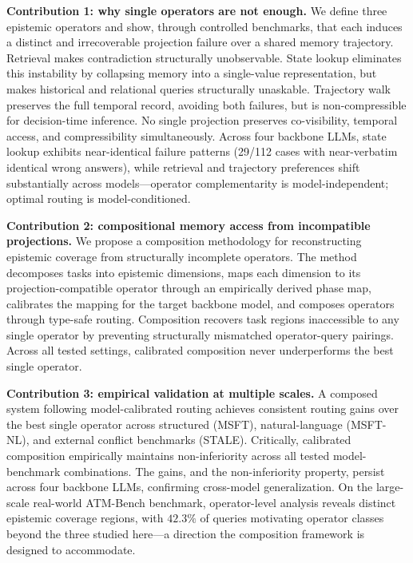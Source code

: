 \documentclass[letterpaper,twocolumn,10pt]{article}
\begin{document}
\textbf{Contribution 1: why single operators are not enough.} We define three epistemic operators and show, through controlled benchmarks, that each induces a distinct and irrecoverable projection failure over a shared memory trajectory. Retrieval makes contradiction structurally unobservable. State lookup eliminates this instability by collapsing memory into a single-value representation, but makes historical and relational queries structurally unaskable. Trajectory walk preserves the full temporal record, avoiding both failures, but is non-compressible for decision-time inference. No single projection preserves co-visibility, temporal access, and compressibility simultaneously. Across four backbone LLMs, state lookup exhibits near-identical failure patterns (29/112 cases with near-verbatim identical wrong answers), while retrieval and trajectory preferences shift substantially across models---operator complementarity is model-independent; optimal routing is model-conditioned.

\textbf{Contribution 2: compositional memory access from incompatible projections.} We propose a composition methodology for reconstructing epistemic coverage from structurally incomplete operators. The method decomposes tasks into epistemic dimensions, maps each dimension to its projection-compatible operator through an empirically derived phase map, calibrates the mapping for the target backbone model, and composes operators through type-safe routing. Composition recovers task regions inaccessible to any single operator by preventing structurally mismatched operator-query pairings. Across all tested settings, calibrated composition never underperforms the best single operator.

\textbf{Contribution 3: empirical validation at multiple scales.} A composed system following model-calibrated routing achieves consistent routing gains over the best single operator across structured (MSFT), natural-language (MSFT-NL), and external conflict benchmarks (STALE). Critically, calibrated composition empirically maintains non-inferiority across all tested model-benchmark combinations. The gains, and the non-inferiority property, persist across four backbone LLMs, confirming cross-model generalization. On the large-scale real-world ATM-Bench benchmark, operator-level analysis reveals distinct epistemic coverage regions, with $42.3\%$ of queries motivating operator classes beyond the three studied here---a direction the composition framework is designed to accommodate.

\end{document}
